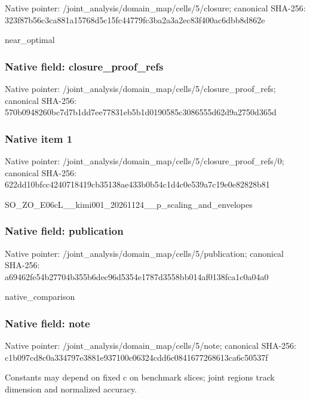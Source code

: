 \documentclass[10pt,a4paper]{article}
\begin{document}
Native pointer: /joint\_analysis/domain\_m\allowbreak{}ap/cells/5/closure; canonical SHA-256: 323f87b56c3ca881a15768d5\allowbreak{}c15fc44779fc3ba2a3a2ec83\allowbreak{}f400ac6dbb8d862e


near\_optimal


\subsubsection{Native field: closure\_proof\_refs}


Native pointer: /joint\_analysis/domain\_m\allowbreak{}ap/cells/5/closure\_proof\allowbreak{}\_refs; canonical SHA-256: 570b0948260bc7d7b1dd7ee7\allowbreak{}7831eb5b1d0190585c308655\allowbreak{}5d62d9a2750d365d



\subsubsection{Native item 1}


Native pointer: /joint\_analysis/domain\_m\allowbreak{}ap/cells/5/closure\_proof\allowbreak{}\_refs/0; canonical SHA-256: 622dd10bfcc4240718419cb3\allowbreak{}5138ae433b0b54c1d4c0e539\allowbreak{}a7c19e0e82828b81


SO\_ZO\_E06cL\_\_kimi001\_202\allowbreak{}61124\_\_p\_scaling\_and\_env\allowbreak{}elopes


\subsubsection{Native field: publication}


Native pointer: /joint\_analysis/domain\_m\allowbreak{}ap/cells/5/publication; canonical SHA-256: a69462fe54b27704b355b6de\allowbreak{}c96d5354e1787d3558bb014a\allowbreak{}f0138fca1c0a04a0


native\_comparison


\subsubsection{Native field: note}


Native pointer: /joint\_analysis/domain\_map/cells/5/note; canonical SHA-256: c1b097cd8c0a334797e3881e\allowbreak{}937100c06324cdd6c0841677\allowbreak{}268613ca6c50537f


Constants may depend on fixed c on benchmark slices; joint regions track dimension and normalized accuracy.
\end{document}
